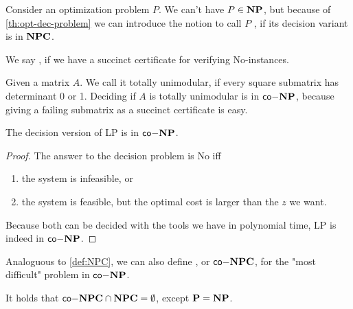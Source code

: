 \begin{definition}[$\NP$-hard]
    Consider an optimization problem $P$. We can't have $P \in \mathbf{NP}$, but because of \autoref{th:opt-dec-problem}
    we can introduce the notion to call $P$ , if its decision variant is in $\mathbf{NPC}$.
\end{definition}
\begin{definition}[$\coNP$]
    We say , if we have a succinct certificate for verifying No-instances.
\end{definition}
\begin{example}
    Given a matrix $A$. We call it totally unimodular, if every square submatrix has determinant 0 or 1.
    Deciding if $A$ is totally unimodular is in $\coNP$, because giving a failing submatrix as a succinct certificate is easy.
\end{example}
\begin{theorem}
    The decision version of LP is in $\coNP$. \label{thm:LP-coNP}
\end{theorem}
\begin{proof}
    The answer to the decision problem is No iff
    \begin{enumerate}
        \item the system is infeasible, or
        \item the system is feasible, but the optimal cost is larger than the $z$ we want.
    \end{enumerate}
    Because both can be decided with the tools we have in polynomial time, LP is indeed in $\coNP$.
\end{proof}
\begin{definition}
    Analoguous to \autoref{def:NPC}, we can also define , or $\mathsf{co-}\mathbf{NPC}$, for the "most difficult" problem in $\coNP$.
\end{definition}
\begin{remark}
    It holds that $\mathsf{co-}\mathbf{NPC} \cap \mathbf{NPC} = \emptyset$, except $\mathbf{P} = \mathbf{NP}$.
\end{remark}
